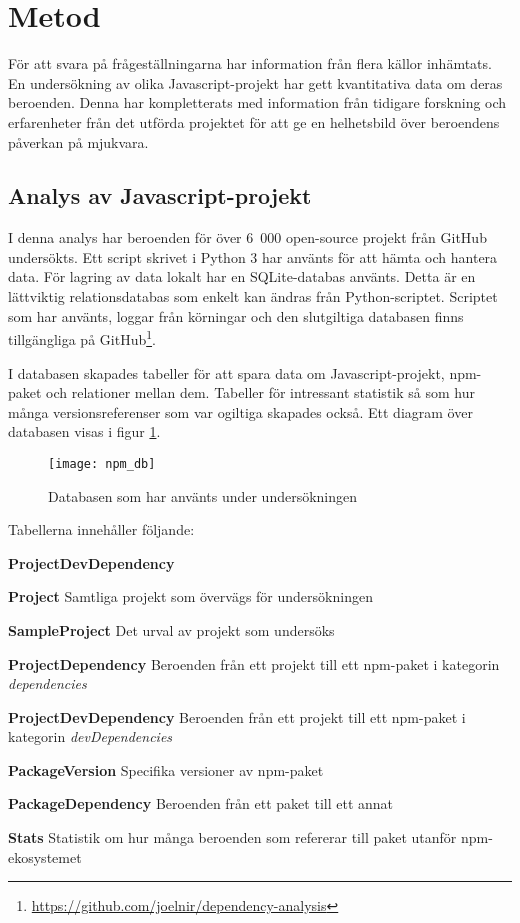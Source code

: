 \section{Metod}
\label{sec:joel_o-method}
För att svara på frågeställningarna har information från flera källor inhämtats. En undersökning av olika Javascript-projekt har gett kvantitativa data om deras beroenden. Denna har kompletterats med information från tidigare forskning och erfarenheter från det utförda projektet för att ge en helhetsbild över beroendens påverkan på mjukvara.

\subsection{Analys av Javascript-projekt}
\label{subsec:joel_o-method-analys}
I denna analys har beroenden för över 6~000 open-source projekt från GitHub undersökts. Ett script skrivet i Python 3 har använts för att hämta och hantera data. För lagring av data lokalt har en SQLite-databas använts. Detta är en lättviktig relationsdatabas som enkelt kan ändras från Python-scriptet. Scriptet som har använts, loggar från körningar och den slutgiltiga databasen finns tillgängliga på GitHub\footnote{\url{https://github.com/joelnir/dependency-analysis}}.

I databasen skapades tabeller för att spara data om Javascript-projekt, npm-paket och relationer mellan dem. Tabeller för intressant statistik så som hur många versionsreferenser som var ogiltiga skapades också. Ett diagram över databasen visas i figur \ref{fig:dependency-db}.

\begin{figure}[ht]
  \centering
  \texttt{[image: npm\_db]}
  \caption{Databasen som har använts under undersökningen}
  \label{fig:dependency-db}
\end{figure}

Tabellerna innehåller följande:

\begin{labeling}{\textbf{ProjectDevDependency}}
  \item [\textbf{Project}] Samtliga projekt som övervägs för undersökningen
  \item [\textbf{SampleProject}] Det urval av projekt som undersöks
  \item [\textbf{ProjectDependency}] Beroenden från ett projekt till ett npm-paket i kategorin \textit{dependencies}
  \item [\textbf{ProjectDevDependency}] Beroenden från ett projekt till ett npm-paket i kategorin \textit{devDependencies}
  \item [\textbf{PackageVersion}] Specifika versioner av npm-paket
  \item [\textbf{PackageDependency}] Beroenden från ett paket till ett annat
  \item [\textbf{Stats}] Statistik om hur många beroenden som refererar till paket utanför npm-ekosystemet
\end{labeling}

